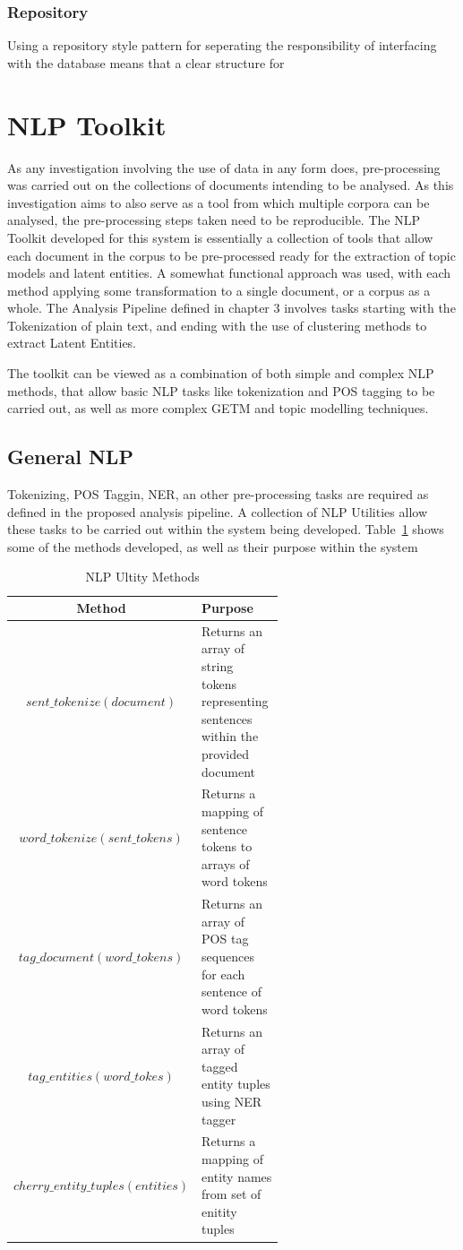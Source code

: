 \documentclass[10pt]{report}
\begin{document}
\subsubsection{Repository}
Using a repository style pattern for seperating the responsibility of interfacing with the database means that a clear structure for 


\section{NLP Toolkit}
As any investigation involving the use of data in any form does, pre-processing was carried out on the collections of documents intending to be analysed. As this investigation aims to also serve as a tool from which multiple corpora can be analysed, the pre-processing steps taken need to be reproducible. The NLP Toolkit developed for this system is essentially a collection of tools that allow each document in the corpus to be pre-processed ready for the extraction of topic models and latent entities. A somewhat functional approach was used, with each method applying some transformation to a single document, or a corpus as a whole. The Analysis Pipeline defined in chapter 3 involves tasks starting with the Tokenization of plain text, and ending with the use of clustering methods to extract Latent Entities.

The toolkit can be viewed as a combination of both simple and complex NLP methods, that allow basic NLP tasks like tokenization and POS tagging to be carried out, as well as more complex GETM and topic modelling techniques.

\subsection{General NLP}
Tokenizing, POS Taggin, NER, an other pre-processing tasks are required as defined in the proposed analysis pipeline. A collection of NLP Utilities allow these tasks to be carried out within the system being developed. Table~\ref{tab:nlp_utilities} shows some of the methods developed, as well as their purpose within the system

\begin{table}[h!]
  \begin{tabular}{c | p{0.6\linewidth} }
    Method & Purpose\\
    \hline
    $sent\_tokenize(document)$ & Returns an array of string tokens representing sentences within the provided document  \\
    $word\_tokenize(sent\_tokens)$& Returns a mapping of sentence tokens to arrays of word tokens \\
    $tag\_document(word\_tokens)$ & Returns an array of POS tag sequences for each sentence of word tokens\\
    $tag\_entities(word\_tokes)$ & Returns an array of tagged entity tuples using NER tagger\\
    $cherry\_entity\_tuples(entities)$ & Returns a mapping of entity names from set of enitity tuples\\
  \end{tabular}
  \caption{NLP Ultity Methods\label{tab:nlp_utilities}}
\end{table}
\end{document}
